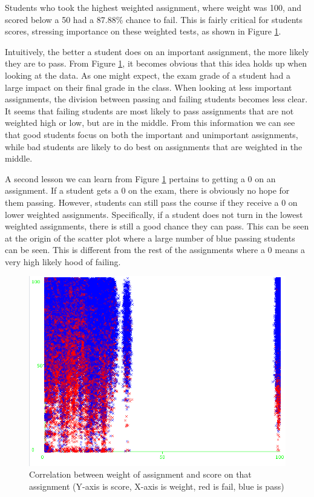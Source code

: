 \documentclass[12pt]{article}
\begin{document}
Students who took the highest weighted assignment, where weight was 100, and scored below a 50 had a 87.88\% chance to fail. This is fairly critical for students scores, stressing importance on these weighted tests, as shown in Figure \ref{fig:weightVSscore}.

Intuitively, the better a student does on an important assignment, the more likely they are to pass. From Figure \ref{fig:weightVSscore}, it becomes obvious that this idea holds up when looking at the data. As one might expect, the exam grade of a student had a large impact on their final grade in the class. When looking at less important assignments, the division between passing and failing students becomes less clear. It seems that failing students are most likely to pass assignments that are not weighted high or low, but are in the middle. From this information we can see that good students focus on both the important and unimportant assignments, while bad students are likely to do best on assignments that are weighted in the middle.

A second lesson we can learn from Figure \ref{fig:weightVSscore} pertains to getting a 0 on an assignment. If a student gets a 0 on the exam, there is obviously no hope for them passing. However, students can still pass the course if they receive a 0 on lower weighted assignments. Specifically, if a student does not turn in the lowest weighted assignments, there is still a good chance they can pass. This can be seen at the origin of the scatter plot where a large number of blue passing students can be seen. This is different from the rest of the assignments where a 0 means a very high likely hood of failing.

 \begin{figure}[h]
 \centering
 \includegraphics[scale =1]{weightscore.png}
 \caption{Correlation between weight of assignment and score on that assignment (Y-axis is score, X-axis is weight, red is fail, blue is pass)}
 \label{fig:weightVSscore}
 \end{figure} 
\end{document}
